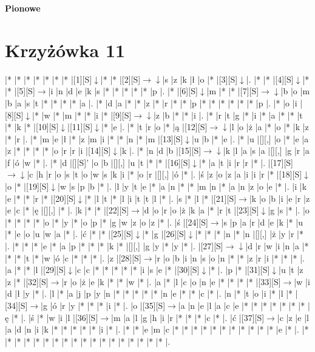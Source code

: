 \documentclass[11pt]{article}
\newcommand\drarr{$\rightarrow \!\!\!\!\! \downarrow$}
\newcommand\rarr{$\rightarrow$}
\newcommand\darr{$\downarrow$}
\begin{document}
\begin{PuzzleClues}{\textbf{Pionowe}\\}
\end{PuzzleClues}\newpage\section*{Krzyżówka 11}

\noindent\begin{Puzzle}{17}{32}|*	|*	|*	|*	|*	|*	|*	|[1][S]\darr	|*	|*	|[2][S]\drarr	|s	|z	|k	|ł	|o	|*	|[3][S]\darr	|.
|*	|*	|[4][S]\darr	|*	|*	|[5][S]\rarr	|i	|n	|d	|e	|k	|s	|*	|*	|*	|*	|*	|p	|.
|*	|[6][S]\darr	|m	|*	|*	|[7][S]\drarr	|b	|o	|m	|b	|a	|s	|t	|*	|*	|*	|*	|a	|.
|*	|d	|a	|*	|*	|z	|*	|r	|*	|*	|p	|*	|*	|*	|*	|*	|*	|p	|.
|*	|o	|i	|[8][S]\darr	|*	|w	|*	|m	|*	|*	|i	|*	|[9][S]\drarr	|z	|b	|*	|*	|i	|.
|*	|r	|t	|g	|*	|i	|*	|a	|*	|*	|t	|*	|k	|*	|[10][S]\darr	|[11][S]\darr	|*	|e	|.
|*	|t	|r	|o	|*	|ą	|[12][S]\drarr	|l	|o	|ż	|a	|*	|o	|*	|k	|z	|*	|r	|.
|*	|m	|e	|ł	|*	|z	|m	|i	|*	|*	|n	|*	|m	|[13][S]\darr	|u	|b	|*	|e	|.
|*	|u	|[][,]{ }	|o	|*	|e	|a	|z	|*	|*	|*	|*	|o	|r	|r	|i	|[14][S]\darr	|k	|.
|*	|n	|d	|b	|[15][S]\drarr	|k	|l	|a	|s	|a	|[][,]{ }	|g	|r	|a	|f	|ó	|w	|*	|.
|*	|d	|[][S]’	|o	|b	|[][,]{ }	|u	|t	|*	|*	|[16][S]\darr	|*	|a	|t	|i	|r	|r	|*	|.
|[17][S]\drarr	|c	|h	|r	|o	|s	|t	|o	|w	|s	|k	|i	|*	|o	|r	|[][,]{ }	|ó	|*	|.
|ś	|z	|o	|z	|a	|i	|i	|r	|*	|[18][S]\darr	|o	|*	|[19][S]\darr	|w	|s	|p	|b	|*	|.
|l	|y	|t	|e	|*	|a	|n	|*	|*	|m	|n	|*	|a	|n	|z	|o	|e	|*	|.
|i	|k	|e	|*	|*	|r	|*	|[20][S]\darr	|*	|l	|t	|*	|l	|i	|t	|t	|l	|*	|.
|s	|*	|l	|*	|[21][S]\rarr	|k	|o	|b	|i	|e	|r	|z	|e	|c	|*	|ę	|[][,]{ }	|*	|.
|k	|*	|*	|[22][S]\rarr	|d	|o	|r	|o	|ż	|k	|a	|*	|r	|t	|[23][S]\darr	|g	|s	|*	|.
|o	|*	|*	|*	|*	|o	|*	|y	|*	|o	|p	|*	|g	|w	|z	|o	|z	|*	|.
|ś	|[24][S]\rarr	|s	|p	|a	|r	|d	|e	|k	|*	|u	|*	|e	|o	|u	|w	|a	|*	|.
|ć	|*	|*	|[25][S]\darr	|*	|g	|[26][S]\darr	|*	|*	|*	|n	|*	|n	|[][,]{ }	|ż	|y	|r	|*	|.
|*	|*	|*	|e	|*	|a	|p	|*	|*	|*	|k	|*	|[][,]{ }	|g	|y	|*	|y	|*	|.
|[27][S]\drarr	|d	|r	|w	|i	|n	|a	|*	|*	|*	|t	|*	|w	|ó	|c	|*	|*	|*	|.
|z	|[28][S]\rarr	|r	|o	|b	|i	|n	|s	|o	|n	|*	|*	|z	|r	|i	|*	|*	|*	|.
|a	|*	|*	|l	|[29][S]\darr	|c	|c	|*	|*	|*	|*	|*	|i	|s	|e	|*	|[30][S]\darr	|*	|.
|p	|*	|[31][S]\darr	|u	|t	|z	|z	|*	|[32][S]\rarr	|r	|o	|ż	|e	|k	|*	|*	|w	|*	|.
|a	|*	|l	|c	|o	|n	|e	|*	|*	|*	|*	|[33][S]\rarr	|w	|i	|d	|ł	|y	|*	|.
|l	|*	|a	|j	|p	|y	|n	|*	|*	|*	|*	|*	|n	|e	|*	|*	|c	|*	|.
|n	|*	|t	|o	|i	|*	|l	|*	|[34][S]\rarr	|g	|ó	|r	|y	|*	|*	|*	|i	|*	|.
|o	|[35][S]\rarr	|a	|n	|e	|l	|a	|c	|e	|*	|*	|*	|*	|*	|*	|*	|ę	|*	|.
|ś	|*	|w	|i	|l	|[36][S]\rarr	|m	|a	|l	|g	|h	|i	|r	|*	|*	|*	|c	|*	|.
|ć	|[37][S]\rarr	|c	|z	|e	|l	|a	|d	|n	|i	|k	|*	|*	|*	|*	|*	|i	|*	|.
|*	|*	|e	|m	|c	|*	|*	|*	|*	|*	|*	|*	|*	|*	|*	|*	|e	|*	|.
|*	|*	|*	|*	|*	|*	|*	|*	|*	|*	|*	|*	|*	|*	|*	|*	|*	|*	|.\end{Puzzle}
\end{document}
